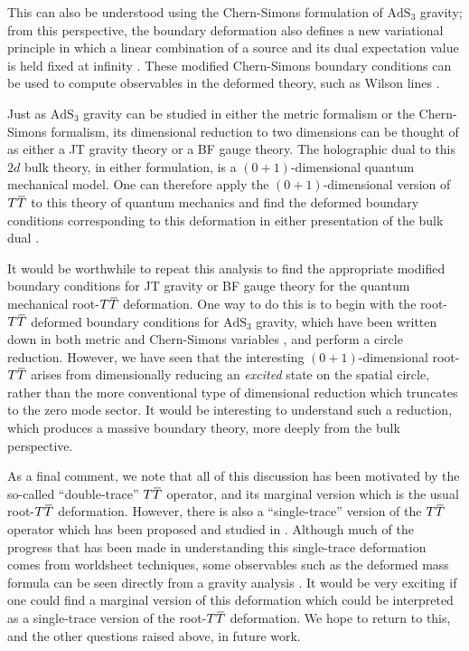 \documentclass[12pt]{article}
\numberwithin{equation}{section}
\newcommand{\overbar}[1]{\mkern 1.5mu\overline{\mkern-1.5mu#1\mkern-1.5mu}\mkern 1.5mu}
\def\TT{{T\overbar{T}}}
\begin{document}
This can also be understood using the Chern-Simons formulation of $\mathrm{AdS}_3$ gravity; from this perspective, the boundary deformation also defines a new variational principle in which a linear combination of a source and its dual expectation value is held fixed at infinity \cite{Llabres:2019jtx}. These modified Chern-Simons boundary conditions can be used to compute observables in the deformed theory, such as Wilson lines \cite{Ebert:2022ehb}.

Just as $\mathrm{AdS}_3$ gravity can be studied in either the metric formalism or the Chern-Simons formalism, its dimensional reduction to two dimensions can be thought of as either a JT gravity theory or a BF gauge theory. The holographic dual to this $2d$ bulk theory, in either formulation, is a $(0+1)$-dimensional quantum mechanical model. One can therefore apply the $(0+1)$-dimensional version of $\TT$ to this theory of quantum mechanics and find the deformed boundary conditions corresponding to this deformation in either presentation of the bulk dual \cite{Ebert:2022ehb}.

It would be worthwhile to repeat this analysis to find the appropriate modified boundary conditions for JT gravity or BF gauge theory for the quantum mechanical root-$\TT$ deformation. One way to do this is to begin with the root-$\TT$ deformed boundary conditions for $\mathrm{AdS}_3$ gravity, which have been written down in both metric and Chern-Simons variables \cite{Ebert:2023tih}, and perform a circle reduction. However, we have seen that the interesting $(0+1)$-dimensional root-$\TT$ arises from dimensionally reducing an \emph{excited} state on the spatial circle, rather than the more conventional type of dimensional reduction which truncates to the zero mode sector. It would be interesting to understand such a reduction, which produces a massive boundary theory, more deeply from the bulk perspective.

As a final comment, we note that all of this discussion has been motivated by the so-called ``double-trace'' $\TT$ operator, and its marginal version which is the usual root-$\TT$ deformation. However, there is also a ``single-trace'' version of the $\TT$ operator which has been proposed and studied in \cite{Giveon:2017nie,Giveon:2017myj}. Although much of the progress that has been made in understanding this single-trace deformation comes from worldsheet techniques, some observables such as the deformed mass formula can be seen directly from a gravity analysis \cite{Chang:2023kkq}. It would be very exciting if one could find a marginal version of this deformation which could be interpreted as a single-trace version of the root-$\TT$ deformation. We hope to return to this, and the other questions raised above, in future work.
\end{document}
